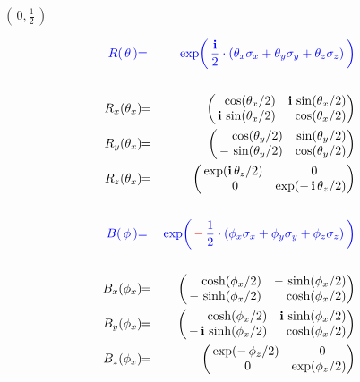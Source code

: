 \begin{frame}{\headingColor\bf\LARGE}
\begin{multicols}{2}
\columnbreak

	\begin{minipage}{7cm}
	\begin{center}
	\vskip -1cm
	\textbf{\Large$\left(\,0,\frac{1}{2}\,\right)$}
	\end{center}
	\vskip -0.3cm
	\begin{eqnarray*}
	{\color{blue}R(\,\mathbf{\theta}\,)}
	& {\color{blue}=} &
		{\color{blue}\exp\!\left(\,\frac{\i}{2}\cdot(\theta_{x}\sigma_{x}+\theta_{y}\sigma_{y}+\theta_{z}\sigma_{z})\,\right)}
	\\ \\
	R_{x}(\theta_{x})\!\!
	& = &
		\!\!\left(\!\!\begin{array}{rr} \cos(\theta_{x}/2) & \i\,\sin(\theta_{x}/2) \\ \i\,\sin(\theta_{x}/2) & \cos(\theta_{x}/2) \end{array}\!\!\!\right)
	\\
	R_{y}(\theta_{x})\!\!
	& = &
		\!\!\left(\!\!\begin{array}{rr} \cos(\theta_{y}/2) & \sin(\theta_{y}/2) \\ -\,\sin(\theta_{y}/2) & \cos(\theta_{y}/2) \end{array}\!\!\!\right)
	\\
	R_{z}(\theta_{x})\!\!
	& = &
		\!\!\left(\!\!\begin{array}{cc} \exp(\i\,\theta_{z}/2) & {\color{white}..}0 \\ {\color{white}.}0 & \exp(-\,\i\,\theta_{z}/2) \end{array}\!\!\!\right)
	\\ \\
	{\color{blue}B(\,\mathbf{\phi}\,)}
	& {\color{blue}=} &
		{\color{blue}\exp\!\left(\,{\color{red}-}\,\frac{1}{2}\cdot(\phi_{x}\sigma_{x}+\phi_{y}\sigma_{y}+\phi_{z}\sigma_{z})\,\right)}
	\\ \\
	B_{x}(\phi_{x})\!\!
	& = &
		\!\!\left(\!\!\begin{array}{rr} \cosh(\phi_{x}/2) & -\,\sinh(\phi_{x}/2) \\ -\,\sinh(\phi_{x}/2) & \cosh(\phi_{x}/2) \end{array}\!\!\!\right)
	\\
	B_{y}(\phi_{x})\!\!
	& = &
		\!\!\left(\!\!\begin{array}{rr} \cosh(\phi_{x}/2) & \i\,\sinh(\phi_{x}/2) \\ -\,\i\,\sinh(\phi_{x}/2) & \cosh(\phi_{x}/2) \end{array}\!\!\!\right)
	\\
	B_{z}(\phi_{x})\!\!
	&=&
		\!\!\left(\!\!\begin{array}{cc} \exp(-\,\phi_{z}/2) & {\color{white}..}0 \\ {\color{white}.}0 & \exp(\phi_{z}/2) \end{array}\!\!\!\right)
	\end{eqnarray*}
	\end{minipage}

\end{multicols}

\end{frame}
\normalsize

